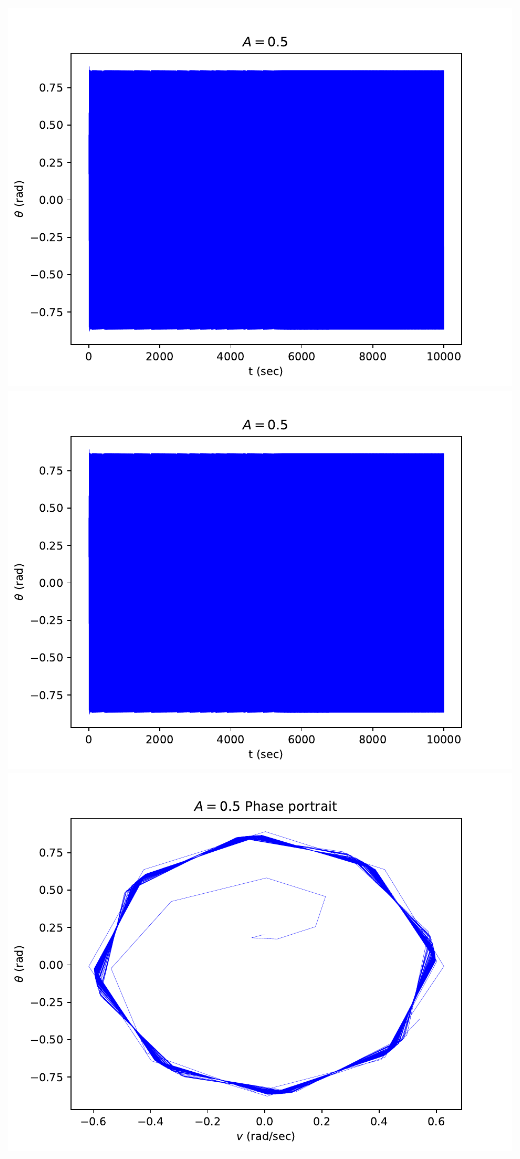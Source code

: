\documentclass[10pt]{article} %
\begin{document}
\begin{center}
\includegraphics[width=.3\textwidth]{../figs/q2_A_05.pdf}
\includegraphics[width=.3\textwidth]{../figs/q2_A_05_no_wrap.pdf}
\includegraphics[width=.3\textwidth]{../figs/q2_A_05_phase.pdf}
\end{center}
\end{document}
